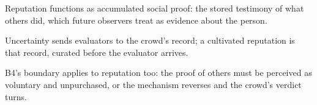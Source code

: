 

\begin{distilled}
  \item Reputation functions as accumulated social proof: the stored testimony of what others did, which future observers treat as evidence about the person.
  \item Uncertainty sends evaluators to the crowd's record; a cultivated reputation is that record, curated before the evaluator arrives.
  \item B4's boundary applies to reputation too: the proof of others must be perceived as voluntary and unpurchased, or the mechanism reverses and the crowd's verdict turns.
\end{distilled}
